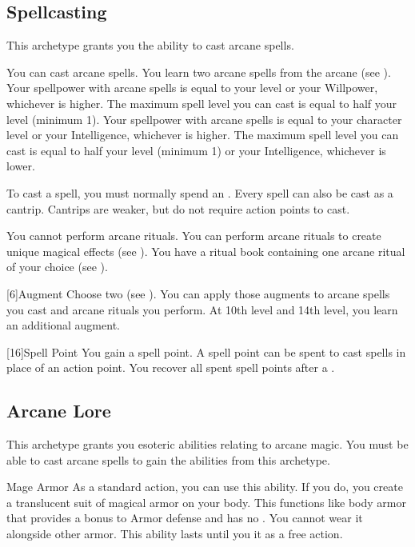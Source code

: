     \subsection{Spellcasting}
        This archetype grants you the ability to cast arcane spells.

        You can cast arcane spells.
        You learn two arcane spells from the arcane  (see ).
         Your spellpower with arcane spells is equal to your level or your Willpower, whichever is higher.
        The maximum spell level you can cast is equal to half your level (minimum 1).
         Your spellpower with arcane spells is equal to your character level or your Intelligence, whichever is higher.
        The maximum spell level you can cast is equal to half your level (minimum 1) or your Intelligence, whichever is lower.

        To cast a spell, you must normally spend an .
        Every spell can also be cast as a cantrip.
        Cantrips are weaker, but do not require action points to cast.

         You cannot perform arcane rituals.
         You can perform arcane rituals to create unique magical effects (see ).
        You have a ritual book containing one arcane ritual of your choice (see ).

        [6]{Augment}
        Choose two  (see ).
        You can apply those augments to arcane spells you cast and arcane rituals you perform.
        At 10th level and 14th level, you learn an additional augment.

        [16]{Spell Point}
        You gain a spell point.
        A spell point can be spent to cast spells in place of an action point.
        You recover all spent spell points after a .

    \subsection{Arcane Lore}
        This archetype grants you esoteric abilities relating to arcane magic.
        You must be able to cast arcane spells to gain the abilities from this archetype.

        \begin{ability}{Mage Armor}
            As a standard action, you can use this ability.
            If you do, you create a translucent suit of magical armor on your body.
            This functions like body armor that provides a  bonus to Armor defense and has no .
            You cannot wear it alongside other armor.
            This ability lasts until you  it as a free action.
        \end{ability}

